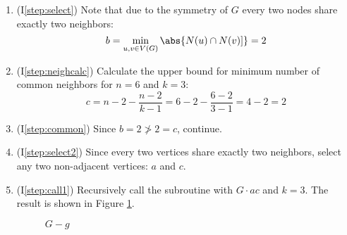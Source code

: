 \begin{enumerate}
\item (I\ref{step:select}) Note that due to the symmetry of \(G\) every two nodes share exactly two neighbors:
  \[b=\min_{u,v\in V(G)}\abs{N(u)\cap N(v)]}=2\]

\item (I\ref{step:neighcalc}) Calculate the upper bound for minimum number of common neighbors for \(n=6\) and
  \(k=3\):
  \[c=n-2-\frac{n-2}{k-1}=6-2-\frac{6-2}{3-1}=4-2=2\]

\item (I\ref{step:common}) Since \(b=2\ngtr2=c\), continue.

\item (I\ref{step:select2}) Since every two vertices share exactly two neighbors, select any two non-adjacent
  vertices: \(a\) and \(c\).

\item (I\ref{step:call1}) Recursively call the subroutine with \(G\cdot ac\) and \(k=3\).  The result is shown in
  Figure \ref{fig:conac}.

  \begin{figure}[h]
    \label{fig:conac}
    \begin{center}
    \end{center}
    \caption{\(G-g\)}
  \end{figure}
\end{enumerate}
